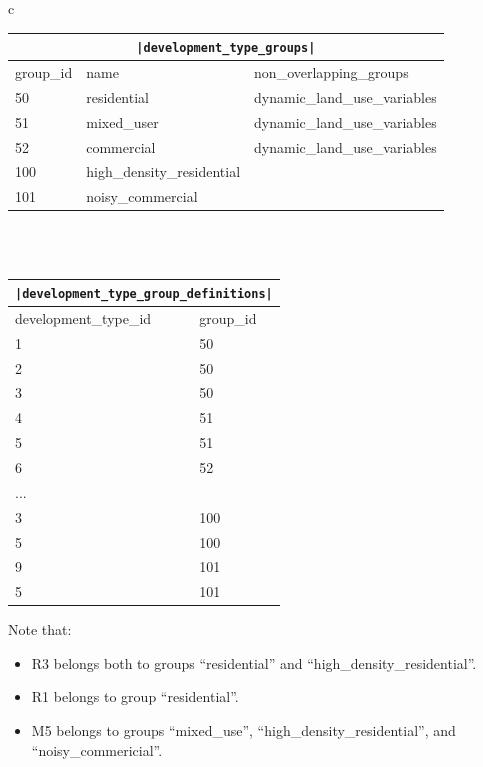 \begin{center}
\begin{tabular}{c}

\begin{tabular}{|l|l|l|}
\multicolumn{3}{c}{\textbf{\tt|development_type_groups|}} \\
\hline
group_id & name & non_overlapping_groups \\

\hline
50 &residential &dynamic_land_use_variables \\

\hline
51 &mixed_user &dynamic_land_use_variables \\

\hline
52 &commercial &dynamic_land_use_variables \\

\hline
100 &high_density_residential & \\

\hline
101 &noisy_commercial & \\

\hline
\end{tabular}

\\ \\

\begin{tabular}{|l|l|}
\multicolumn{2}{c}{\textbf{\tt|development_type_group_definitions|}} \\

\hline
development_type_id & group_id \\

\hline
1 & 50 \\
\hline
2 & 50 \\
\hline
3 & 50 \\
\hline
4 & 51 \\
\hline
5 & 51 \\
\hline
6 & 52 \\
\hline
... &  \\
\hline
3 & 100 \\
\hline
5 & 100 \\
\hline
9 & 101 \\
\hline
5 & 101 \\
\hline
\end{tabular}

\end{tabular}
\end{center}


Note that:
\begin{itemize}
\tight
\item R3 belongs both to groups ``residential'' and
``high_density_residential''.
\item R1 belongs to group ``residential''.
\item M5 belongs to groups ``mixed_use'', ``high_density_residential'', and
``noisy_commericial''.
\end{itemize}


